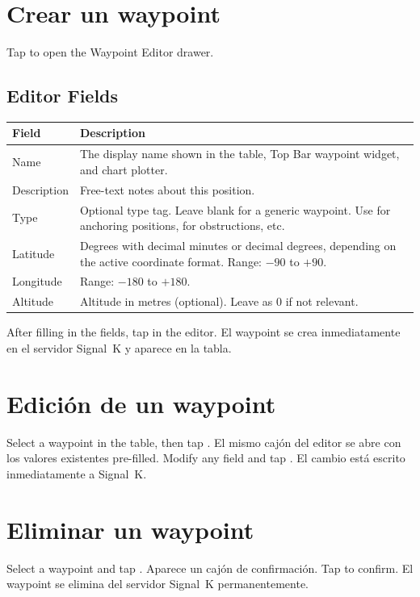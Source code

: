 \section{Crear un waypoint}

Tap  to open the Waypoint Editor drawer.


\subsection{Editor Fields}

\begin{longtable}{L{3cm} L{10.7cm}}
\toprule
{}
{\sffamily\bfseries\color{white} Field} &
{\sffamily\bfseries\color{white} Description} \\
\midrule
Name & The display name shown in the table, Top Bar waypoint widget, and chart plotter. \\
Description & Free-text notes about this position. \\
Type & Optional type tag. Leave blank for a generic waypoint. Use  for anchoring positions,  for obstructions, etc. \\
Latitude & Degrees with decimal minutes or decimal degrees, depending on the active coordinate format. Range: $-90$ to $+90$. \\
Longitude & Range: $-180$ to $+180$. \\
Altitude & Altitude in metres (optional). Leave as 0 if not relevant. \\
\bottomrule
\end{longtable}

After filling in the fields, tap  in the editor.
El waypoint se crea inmediatamente en el servidor Signal~K y aparece en la tabla.

\section{Edición de un waypoint}

Select a waypoint in the table, then tap .
El mismo cajón del editor se abre con los valores existentes pre-filled.
Modify any field and tap .
El cambio está escrito inmediatamente a Signal~K.

\section{Eliminar un waypoint}

Select a waypoint and tap .
Aparece un cajón de confirmación.
Tap  to confirm.
El waypoint se elimina del servidor Signal~K permanentemente.

